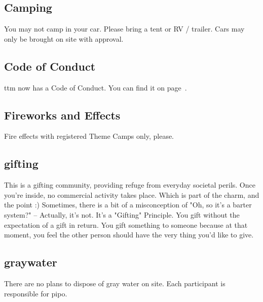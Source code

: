 \begin{multicols}{2}


\subsection*{Camping}
You may not camp in your car. Please bring a tent or RV / trailer.
Cars may only be brought on site with approval.

\subsection*{Code of Conduct}
\Gls{ttm} now has a Code of Conduct. You can find it on page~\pageref{coc}.

\subsection*{Fireworks and Effects}
Fire effects with registered Theme Camps only, please.

\subsection*{\Gls{gifting}}\label{gifting}
This is a gifting community, providing refuge from everyday societal perils.  Once you're inside, no commercial activity takes place. Which is part of the charm, and the point :) 
Sometimes, there is a bit of a misconception of "Oh, so it's a barter system?" -- Actually, it's not. It's a "Gifting" Principle.
You gift without the expectation of a gift in return. 
You gift something to someone because at that moment, you feel the other person should have the very thing you'd like to give.

\subsection*{\Gls{graywater}}
There are no plans to dispose of gray water on site.  Each participant is responsible for \gls{pipo}.



\end{multicols}
